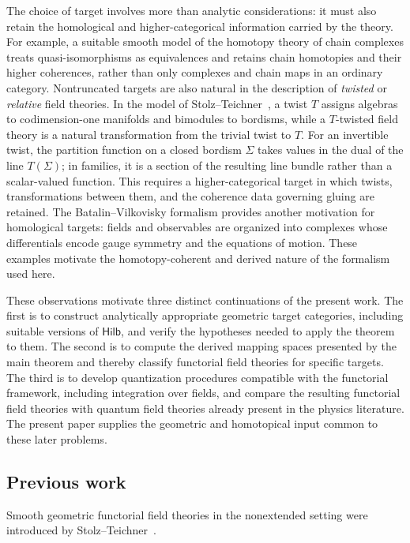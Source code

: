 \documentclass{amsart}
\newcommand{\cat}[1]{\mathsf{#1}}
\theoremstyle{definition}
\numberwithin{equation}{subsection}
\numberwithin{subsubsection}{subsection}
\begin{document}
The choice of target involves more than analytic considerations: it must also
retain the homological and higher-categorical information carried by the theory.
For example, a suitable smooth model of the homotopy theory of chain complexes
treats quasi-isomorphisms as equivalences and retains chain homotopies and their
higher coherences, rather than only complexes and chain maps in an ordinary
category. Nontruncated targets are also natural in the description of
\emph{twisted} or \emph{relative} field theories. In the model of
Stolz--Teichner~\cite{ST11}, a twist \(T\) assigns algebras to codimension-one
manifolds and bimodules to bordisms, while a \(T\)-twisted field theory is a
natural transformation from the trivial twist to \(T\). For an invertible twist,
the partition function on a closed bordism \(\Sigma\) takes values in the dual
of the line \(T(\Sigma)\); in families, it is a section of the resulting line
bundle rather than a scalar-valued function. This requires a higher-categorical
target in which twists, transformations between them, and the coherence data
governing gluing are retained. The Batalin–Vilkovisky formalism provides another
motivation for homological targets: fields and observables are organized into
complexes whose differentials encode gauge symmetry and the equations of motion.
These examples motivate the homotopy-coherent and derived nature of the
formalism used here.

These observations motivate three distinct continuations of the present work.
The first is to construct analytically appropriate geometric target categories,
including suitable versions of \(\cat{Hilb}\), and verify the hypotheses needed
to apply the theorem to them. The second is to compute the derived mapping
spaces presented by the main theorem and thereby classify functorial field
theories for specific targets. The third is to develop quantization procedures
compatible with the functorial framework, including integration over fields, and
compare the resulting functorial field theories with quantum field theories
already present in the physics literature. The present paper supplies the
geometric and homotopical input common to these later problems.

\subsection*{Previous work}

Smooth geometric functorial field theories in the nonextended setting were
introduced by Stolz--Teichner~\cite{ST04,ST11}.
\end{document}
